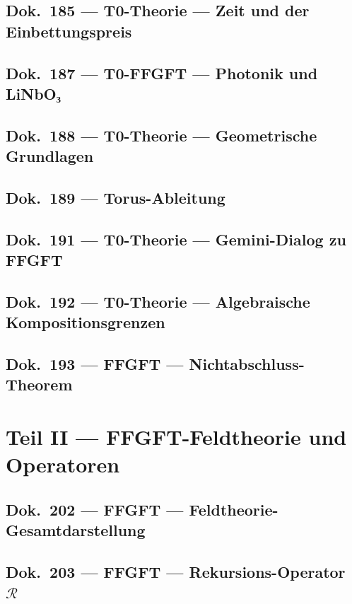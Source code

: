 	\chapter{Dok.~185 --- T0-Theorie — Zeit und der Einbettungspreis}
	
	\chapter{Dok.~187 --- T0-FFGFT — Photonik und LiNbO₃}
	
	\chapter{Dok.~188 --- T0-Theorie — Geometrische Grundlagen}
	
	\chapter{Dok.~189 --- Torus-Ableitung}
	
	\chapter{Dok.~191 --- T0-Theorie — Gemini-Dialog zu FFGFT}
	
	\chapter{Dok.~192 --- T0-Theorie — Algebraische Kompositionsgrenzen}
	
	\chapter{Dok.~193 --- FFGFT — Nichtabschluss-Theorem}
	
	\part{Teil II --- FFGFT-Feldtheorie und Operatoren}
	\chapter{Dok.~202 --- FFGFT — Feldtheorie-Gesamtdarstellung}
	
	\chapter{Dok.~203 --- FFGFT — Rekursions-Operator $\mathcal{R}$}
	
